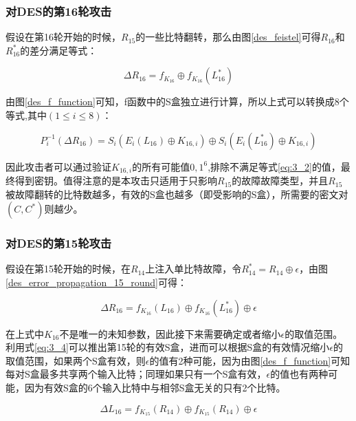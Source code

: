 \documentclass[a4paper,12pt]{article}
\begin{document}
\begin{CJK}{UTF8}{gkai}
\subsubsection{对DES的第16轮攻击}
假设在第16轮开始的时候，$R_{15}$的一些比特翻转，那么由图\ref{des_feistel}可得$R_{16}$和$R_{16}^*$的差分满足等式：

\begin{equation}
\label{eq:3_1}
\Delta R_{16} = f_{K_{16}} \oplus f_{K_{16}}(L_{16}^*)
\end{equation}

由图\ref{des_f_function}可知，f函数中的S盒独立进行计算，所以上式可以转换成8个等式,其中$(1 \leq i \leq 8)$：

\begin{equation}
\label{eq:3_2}
P_i^{-1}(\Delta R_{16}) = S_i(E_i(L_{16}) \oplus K_{16,i}) \oplus S_i(E_i(L_{16}^*) \oplus K_{16,i})
\end{equation}

因此攻击者可以通过验证$K_{16,i}$的所有可能值${0,1}^6$,排除不满足等式\ref{eq:3_2}的值，最终得到密钥。值得注意的是本攻击只适用于只影响$R_{15}$的故障故障类型，并且$R_{15}$被故障翻转的比特数越多，有效的S盒也越多（即受影响的S盒），所需要的密文对$(C,C^*)$则越少。

\subsubsection{对DES的第15轮攻击}
假设在第15轮开始的时候，在$R_{14}$上注入单比特故障，令$R_{14}^*=R_{14} \oplus \epsilon$，由图\ref{des_error_propagation_15_round}可得：

\begin{equation}
\label{eq:3_3}
\Delta R_{16} = f_{K_{16}}(L_{16}) \oplus f_{K_{16}}(L_{16}^*) \oplus \epsilon
\end{equation}

在上式中$K_{16}$不是唯一的未知参数，因此接下来需要确定或者缩小$\epsilon$的取值范围。利用式\ref{eq:3_4}可以推出第15轮的有效S盒，进而可以根据S盒的有效情况缩小$\epsilon$的取值范围，如果两个S盒有效，则$\epsilon$的值有2种可能，因为由图\ref{des_f_function}可知每对S盒最多共享两个输入比特；同理如果只有一个S盒有效，$\epsilon$的值也有两种可能，因为有效S盒的6个输入比特中与相邻S盒无关的只有2个比特。

\begin{equation}
\label{eq:3_4}
\Delta L_{16} = f_{K_{15}}(R_{14}) \oplus f_{K_{15}}(R_{14}) \oplus \epsilon
\end{equation}


\end{CJK}
\end{document}
